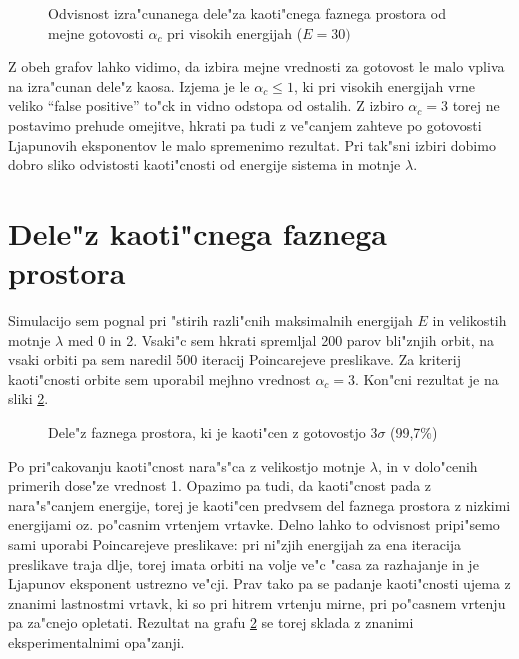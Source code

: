 \documentclass[a4paper,10pt]{article}
\begin{document}
\begin{figure}[H]
 
 \caption{Odvisnost izra"cunanega dele"za kaoti"cnega faznega prostora od mejne gotovosti $\alpha_c$ pri visokih energijah ($E=30)$}
 \label{fig:gotovost-30}
\end{figure}

Z obeh grafov lahko vidimo, da izbira mejne vrednosti za gotovost le malo vpliva na izra"cunan dele"z kaosa. Izjema je le $\alpha_c \leq 1$, ki pri visokih energijah vrne veliko ``false positive'' to"ck in vidno odstopa od ostalih. Z izbiro $\alpha_c = 3$ torej ne postavimo prehude omejitve, hkrati pa tudi z ve"canjem zahteve po gotovosti Ljapunovih eksponentov le malo spremenimo rezultat. Pri tak"sni izbiri dobimo dobro sliko odvistosti kaoti"cnosti od energije sistema in motnje $\lambda$. 


\section{Dele"z kaoti"cnega faznega prostora}
Simulacijo sem pognal pri "stirih razli"cnih maksimalnih energijah $E$ in velikostih motnje $\lambda$ med 0 in 2. Vsaki"c sem hkrati spremljal 200 parov bli"znjih orbit, na vsaki orbiti pa sem naredil 500 iteracij Poincarejeve preslikave. Za kriterij kaoti"cnosti orbite sem uporabil mejhno vrednost $\alpha_c=3$. Kon"cni rezultat je na sliki \ref{fig:kaos}. 

\begin{figure}[H]
 \label{fig:kaos}
 
  \caption{Dele"z faznega prostora, ki je kaoti"cen z gotovostjo $3\sigma$ (99,7\%)}
\end{figure}

Po pri"cakovanju kaoti"cnost nara"s"ca z velikostjo motnje $\lambda$, in v dolo"cenih primerih dose"ze vrednost 1. Opazimo pa tudi, da kaoti"cnost pada z nara"s"canjem energije, torej je kaoti"cen predvsem del faznega prostora z nizkimi energijami oz. po"casnim vrtenjem vrtavke. Delno lahko to odvisnost pripi"semo sami uporabi Poincarejeve preslikave: pri ni"zjih energijah za ena iteracija preslikave traja dlje, torej imata orbiti na volje ve"c "casa za razhajanje in je Ljapunov eksponent ustrezno ve"cji. Prav tako pa se padanje kaoti"cnosti ujema z znanimi lastnostmi vrtavk, ki so pri hitrem vrtenju mirne, pri po"casnem vrtenju pa za"cnejo opletati. Rezultat na grafu \ref{fig:kaos} se torej sklada z znanimi eksperimentalnimi opa"zanji. 
\end{document}
